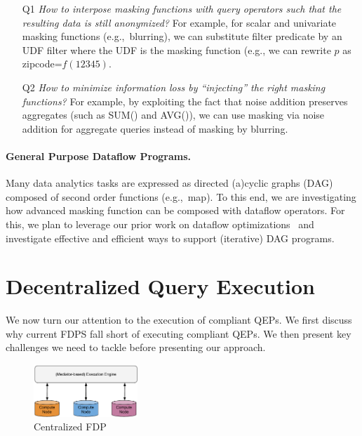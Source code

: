 \documentclass[11pt]{article}
\begin{document}
\begin{itemize}
  \item[Q1] \emph{How to interpose masking functions with
  query operators such that the resulting data is still
  anonymized?} For example, for scalar and univariate
  masking functions (e.g.,~blurring), we can substitute
  filter predicate by an UDF filter where the UDF is the
  masking function (e.g., we can rewrite $p$ as zipcode=$f(12345)$.
  \item[Q2] \emph{How to minimize information loss by
  ``injecting'' the right masking functions?} For example,
  by exploiting the fact that noise addition preserves
  aggregates (such as SUM() and AVG()), we can use masking
  via noise addition for aggregate queries instead of
  masking by blurring.
\end{itemize}

 
\paragraph{General Purpose Dataflow Programs.} Many data
analytics tasks are expressed as directed (a)cyclic graphs
(DAG) composed of second order functions (e.g.,~map). To
this end, we are investigating how advanced masking function
can be composed with dataflow operators. For this, we plan
to leverage our prior work on dataflow
optimizations~\cite{heuske2012} and investigate effective
and efficient ways to support (iterative) DAG programs.



\section{Decentralized Query Execution} %
\label{sec:decentralized_query_execution}

We now turn our attention to the execution of compliant
QEPs. We first discuss why current FDPS fall short of
executing compliant QEPs. We then present key challenges we
need to tackle before presenting our approach.


\begin{figure}
\centering
\includegraphics[width=0.35\textwidth]{figs/mediator-based.pdf}
\caption{Centralized FDP}
\end{figure}
\end{document}
